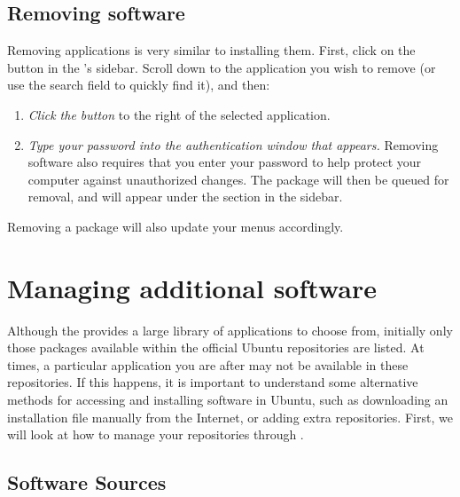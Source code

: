 \subsection{Removing software}

Removing applications is very similar to installing them. First, click on the  button in the 's sidebar. Scroll down to the application you wish to remove (or use the search field to quickly find it), and then:
\begin{enumerate}
  \item \emph{Click the  button} to the right of the selected application.
  \item \emph{Type your password into the authentication window that appears.} Removing software also requires that you enter your password to help protect your computer against unauthorized changes. The package will then be queued for removal, and will appear under the  section in the sidebar.
\end{enumerate}

Removing a package will also update your menus accordingly.

\section{Managing additional software}

Although the  provides a large library of applications to choose from, initially only those packages available within the official Ubuntu repositories are listed. At times, a particular application you are after may not be available in these repositories. If this happens, it is important to understand some alternative methods for accessing and installing software in Ubuntu, such as downloading an installation file manually from the Internet, or adding extra repositories. First, we will look at how to manage your repositories through .

\subsection{Software Sources}
\label{sec:software-sources}

